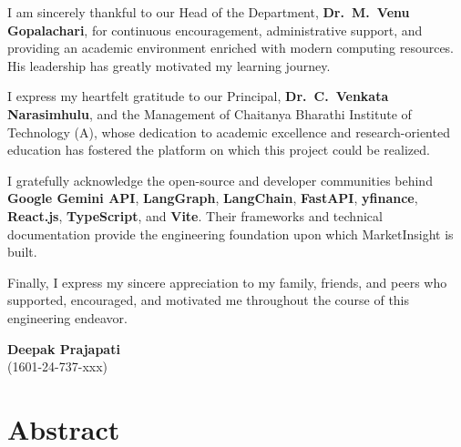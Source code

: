 \documentclass[12pt,a4paper]{report}
\begin{document}
I am sincerely thankful to our Head of the Department, \textbf{Dr.\ M.\ Venu Gopalachari}, for continuous encouragement, administrative support, and providing an academic environment enriched with modern computing resources. His leadership has greatly motivated my learning journey.

I express my heartfelt gratitude to our Principal, \textbf{Dr.\ C.\ Venkata Narasimhulu}, and the Management of Chaitanya Bharathi Institute of Technology (A), whose dedication to academic excellence and research-oriented education has fostered the platform on which this project could be realized.

I gratefully acknowledge the open-source and developer communities behind \textbf{Google Gemini API}, \textbf{LangGraph}, \textbf{LangChain}, \textbf{FastAPI}, \textbf{yfinance}, \textbf{React.js}, \textbf{TypeScript}, and \textbf{Vite}. Their frameworks and technical documentation provide the engineering foundation upon which MarketInsight is built.

Finally, I express my sincere appreciation to my family, friends, and peers who supported, encouraged, and motivated me throughout the course of this engineering endeavor.

\vspace{1.5cm}
\hfill
\begin{minipage}{0.35\textwidth}
  \raggedright
  \textbf{Deepak Prajapati}\\
  (1601-24-737-xxx)
\end{minipage}

\clearpage
\chapter*{Abstract}
\end{document}
